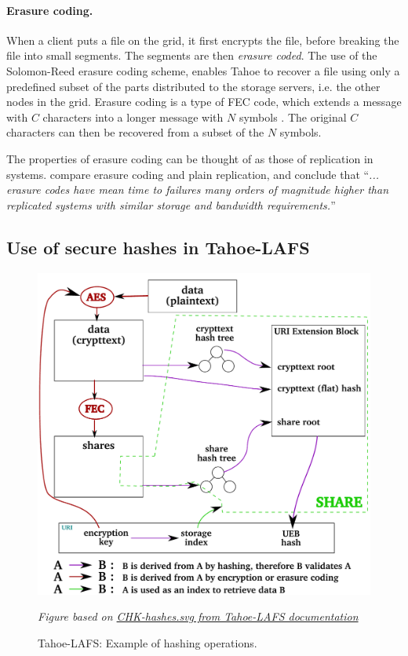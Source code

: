 \documentclass[english,12pt,a4paper]{book}
\begin{document}
\paragraph{Erasure coding.}

When a client puts a file on the grid, it first encrypts the file, before
breaking the file into small segments. The segments are then \emph{erasure
coded}.  The use of the Solomon-Reed erasure coding scheme, enables Tahoe to
recover a file using only a predefined subset of the parts distributed to the
storage servers, i.e. the other nodes in the grid. Erasure coding is a type of
\ac{FEC} code, which extends a message with $C$ characters into a longer message
with $N$ symbols \cite{t_reed-solomon}.  The original $C$ characters can then be
recovered from a subset of the $N$ symbols.

The properties of erasure coding can be thought of as those of replication in
 systems. \citet*{t_erasure} compare erasure coding and plain
replication, and conclude that ``\emph{...  erasure codes have mean time to
failures many orders of magnitude higher than replicated systems with similar
storage and bandwidth requirements.}''

\subsection{Use of secure hashes in Tahoe-LAFS}

\begin{figure}[!h]
    \centering
    \includegraphics[width=0.9\columnwidth]{Tahoe-hashes.pdf}
    \caption{Tahoe-LAFS: Example of hashing operations.}
    \label{fig:tahoehashing}
    \emph{Figure based on
     \href{http://tahoe-lafs.org/source/tahoe/trunk/docs/specifications/CHK-hashes.svg}
     {CHK-hashes.svg from Tahoe-LAFS documentation}}
\end{figure}
\end{document}
